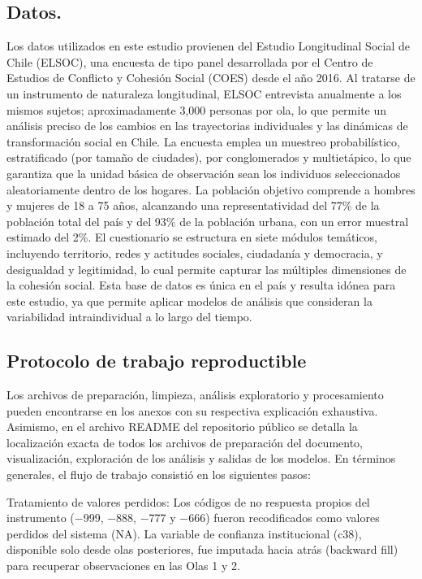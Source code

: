 \documentclass[
  spanish,
  a4paper,
  oneside]{scrbook}
\begin{document}
\subsection{Datos.}\label{datos.}

Los datos utilizados en este estudio provienen del Estudio Longitudinal
Social de Chile (ELSOC), una encuesta de tipo panel desarrollada por el
Centro de Estudios de Conflicto y Cohesión Social (COES) desde el año
2016. Al tratarse de un instrumento de naturaleza longitudinal, ELSOC
entrevista anualmente a los mismos sujetos; aproximadamente 3,000
personas por ola, lo que permite un análisis preciso de los cambios en
las trayectorias individuales y las dinámicas de transformación social
en Chile. La encuesta emplea un muestreo probabilístico, estratificado
(por tamaño de ciudades), por conglomerados y multietápico, lo que
garantiza que la unidad básica de observación sean los individuos
seleccionados aleatoriamente dentro de los hogares. La población
objetivo comprende a hombres y mujeres de 18 a 75 años, alcanzando una
representatividad del 77\% de la población total del país y del 93\% de
la población urbana, con un error muestral estimado del 2\%. El
cuestionario se estructura en siete módulos temáticos, incluyendo
territorio, redes y actitudes sociales, ciudadanía y democracia, y
desigualdad y legitimidad, lo cual permite capturar las múltiples
dimensiones de la cohesión social. Esta base de datos es única en el
país y resulta idónea para este estudio, ya que permite aplicar modelos
de análisis que consideran la variabilidad intraindividual a lo largo
del tiempo.

\subsection{Protocolo de trabajo
reproductible}\label{protocolo-de-trabajo-reproductible}

Los archivos de preparación, limpieza, análisis exploratorio y
procesamiento pueden encontrarse en los anexos con su respectiva
explicación exhaustiva. Asimismo, en el archivo README del repositorio
público se detalla la localización exacta de todos los archivos de
preparación del documento, visualización, exploración de los análisis y
salidas de los modelos. En términos generales, el flujo de trabajo
consistió en los siguientes pasos:

Tratamiento de valores perdidos: Los códigos de no respuesta propios del
instrumento (−999, −888, −777 y −666) fueron recodificados como valores
perdidos del sistema (NA). La variable de confianza institucional (c38),
disponible solo desde olas posteriores, fue imputada hacia atrás
(backward fill) para recuperar observaciones en las Olas 1 y 2.
\end{document}
